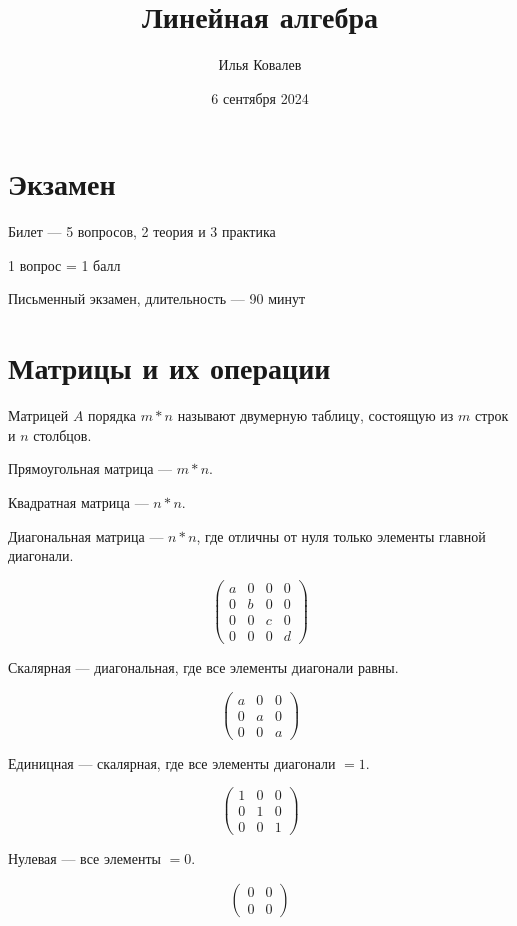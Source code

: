 \documentclass{article}
\begin{document}
\title{Линейная алгебра}
\author{Илья Ковалев}
\date{6 сентября 2024}
\maketitle

\section{Экзамен}

Билет --- 5 вопросов, 2 теория и 3 практика

1 вопрос = 1 балл

Письменный экзамен, длительность --- 90 минут

\section{Матрицы и их операции}

Матрицей $A$ порядка $m * n$ называют двумерную таблицу, состоящую из $m$ строк и $n$ столбцов.

Прямоугольная матрица --- $m * n$.

Квадратная матрица --- $n * n$.

Диагональная матрица --- $n * n$, где отличны от нуля только элементы главной диагонали.

\[
\begin{pmatrix}
	a & 0 & 0 & 0\\
	0 & b & 0 & 0\\
	0 & 0 & c & 0\\
	0 & 0 & 0 & d
\end{pmatrix}
\]

Скалярная --- диагональная, где все элементы диагонали равны.

\[
\begin{pmatrix}
	a & 0 & 0\\
	0 & a & 0\\
	0 & 0 & a
\end{pmatrix}
\]

Единицная --- скалярная, где все элементы диагонали $= 1$.

\[
\begin{pmatrix}
	1 & 0 & 0\\
	0 & 1 & 0\\
	0 & 0 & 1
\end{pmatrix}
\]

Нулевая --- все элементы $= 0$.

\[
\begin{pmatrix}
	0 & 0 \\
	0 & 0
\end{pmatrix}
\]
\end{document}
